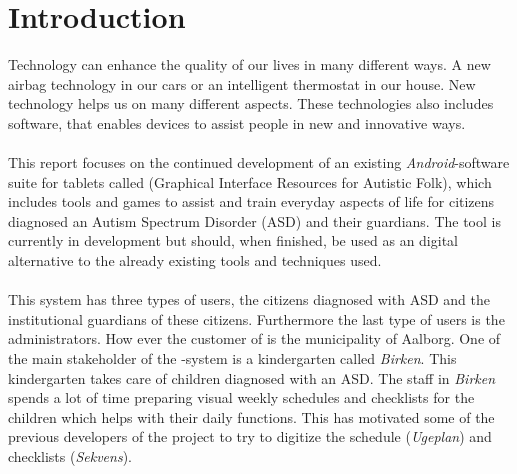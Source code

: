 \chapter{Introduction}
\label{cha:introduction}

Technology can enhance the quality of our lives in many different ways. A new airbag technology in our cars or an intelligent thermostat in our house. New technology helps us on many different aspects. These technologies also includes software, that enables devices to assist people in new and innovative ways.
\\\\
This report focuses on the continued development of an existing \emph{Android}-software suite for tablets called \giraf (Graphical Interface Resources for Autistic Folk), which includes tools and games to assist and train everyday aspects of life for citizens diagnosed an Autism Spectrum Disorder (ASD) \parencite{asd} and their guardians. The tool is currently in development but should, when finished, be used as an digital alternative to the already existing tools and techniques used. 
\\\\
This system has three types of users, the citizens diagnosed with ASD and the institutional guardians of these citizens. Furthermore the last type of users is the administrators. How ever the customer of \giraf is the municipality of Aalborg.
One of the main stakeholder of the \giraf-system is a kindergarten called \emph{Birken}. This kindergarten takes care of children diagnosed with an ASD. The staff in \emph{Birken} spends a lot of time preparing visual weekly schedules and checklists for the children which helps with their daily functions. This has motivated some of the previous developers of the \giraf project to try to digitize the schedule (\emph{Ugeplan}) and checklists (\emph{Sekvens}). 
\\\\



